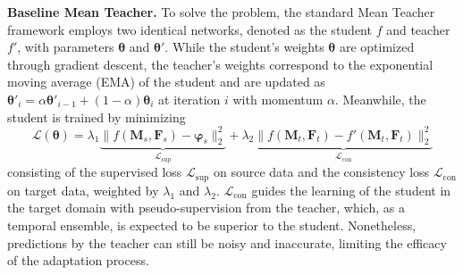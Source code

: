 \documentclass[runningheads]{llncs}
\begin{document}
\textbf{Baseline Mean Teacher.}
To solve the problem, the standard Mean Teacher framework \cite{bigalke2022adapting,french2018selfensembling,tarvainen2017mean} employs two identical networks, denoted as the student $f$ and teacher $f'$, with parameters $\boldsymbol{\theta}$ and $\boldsymbol{\theta}'$.
While the student's weights $\boldsymbol{\theta}$ are optimized through gradient descent, the teacher's weights correspond to the exponential moving average (EMA) of the student and are updated as $\boldsymbol{\theta}'_i=\alpha\boldsymbol{\theta}'_{i-1}+(1-\alpha)\boldsymbol{\theta}_i$ at iteration $i$ with momentum $\alpha$. 
Meanwhile, the student is trained by minimizing
\begin{equation}
\label{eq:baseline_loss}
    \mathcal{L}(\boldsymbol{\theta})=\lambda_1\underbrace{\|f(\boldsymbol{M}_s,\boldsymbol{F}_s)-\boldsymbol{\varphi}_s\|_2^2}_{\mathcal{L}_{\mathrm{sup}}}+\lambda_2\underbrace{\|f(\boldsymbol{M}_t,\boldsymbol{F}_t)-f'(\boldsymbol{M}_t,\boldsymbol{F}_t)\|_2^2}_{\mathcal{L}_{\mathrm{con}}}
\end{equation}
consisting of the supervised loss $\mathcal{L}_{\mathrm{sup}}$ on source data and the consistency loss $\mathcal{L}_{\mathrm{con}}$ on target data, weighted by $\lambda_1$ and $\lambda_2$.
$\mathcal{L}_{\mathrm{con}}$ guides the learning of the student in the target domain with pseudo-supervision from the teacher, which, as a temporal ensemble, is expected to be superior to the student.
Nonetheless, predictions by the teacher can still be noisy and inaccurate, limiting the efficacy of the adaptation process.
\end{document}
